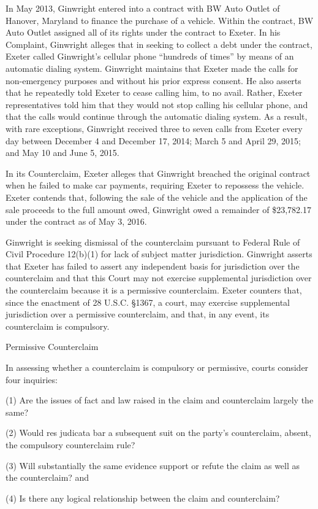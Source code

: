 \documentclass[11pt,letterpaper,twoside]{article}
\renewenvironment{quote}{%
   \list{}{%
     \leftmargin2em   %
     \rightmargin\leftmargin\parsep .1em }
   \item\relax
}
{\endlist}
\begin{document}
In May 2013, Ginwright entered into a contract with BW Auto Outlet of
Hanover, Maryland to finance the purchase of a vehicle. Within the
contract, BW Auto Outlet assigned all of its rights under the contract
to Exeter. In his Complaint, Ginwright alleges that in seeking to
collect a debt under the contract, Exeter called Ginwright's cellular
phone ``hundreds of times'' by means of an automatic dialing system.
Ginwright maintains that Exeter made the calls for non-emergency
purposes and without his prior express consent. He also asserts that he
repeatedly told Exeter to cease calling him, to no avail. Rather, Exeter
representatives told him that they would not stop calling his cellular
phone, and that the calls would continue through the automatic dialing
system. As a result, with rare exceptions, Ginwright received three to
seven calls from Exeter every day between December 4 and December 17,
2014; March 5 and April 29, 2015; and May 10 and June 5, 2015.

In its Counterclaim, Exeter alleges that Ginwright breached the original
contract when he failed to make car payments, requiring Exeter to
repossess the vehicle. Exeter contends that, following the sale of the
vehicle and the application of the sale proceeds to the full amount
owed, Ginwright owed a remainder of \$23,782.17 under the contract as of
May 3, 2016.

Ginwright is seeking dismissal of the counterclaim pursuant to Federal
Rule of Civil Procedure 12(b)(1) for lack of subject matter
jurisdiction. Ginwright asserts that Exeter has failed to assert any
independent basis for jurisdiction over the counterclaim and that this
Court may not exercise supplemental jurisdiction over the counterclaim
because it is a permissive counterclaim. Exeter counters that, since the
enactment of 28 U.S.C. §1367, a court, may exercise supplemental
jurisdiction over a permissive counterclaim, and that, in any event, its
counterclaim is compulsory.

{Permissive Counterclaim}

In assessing whether a counterclaim is compulsory or permissive, courts
consider four inquiries:

\begin{quote}
(1) Are the issues of fact and law raised in the claim and counterclaim
largely the same?

(2) Would res judicata bar a subsequent suit on the party's
counterclaim, absent, the compulsory counterclaim rule?

(3) Will substantially the same evidence support or refute the claim as
well as the counterclaim? and

(4) Is there any logical relationship between the claim and
counterclaim?
\end{quote}
\end{document}
